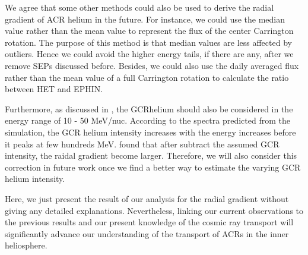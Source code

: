 We agree that some other methods could also be used to derive the radial gradient of \ac{ACR} helium in the future. For instance, we could use the median value rather than the mean value to represent the flux of the center Carrington rotation. The purpose of this method is that median values are less affected by outliers. Hence we could avoid the higher energy tails, if there are any, after we remove \acp{SEP} discussed before. Besides, we could also use the daily averaged flux rather than the mean value of a full Carrington rotation to calculate the ratio between \ac{HET} and \ac{EPHIN}. 


Furthermore, as discussed in \citet{Rankin2021ApJ}, the \ac{GCR}helium should also be considered in the energy range of 10 - 50 MeV/nuc. According to the spectra predicted from the simulation, the \ac{GCR} helium intensity increases with the energy increases before it peaks at few hundreds MeV. \citet{Rankin2021ApJ} found that after subtract the assumed \ac{GCR} intensity, the raidal gradient become larger. Therefore, we will also consider this correction in future work once we find a better way to estimate the varying \ac{GCR} helium intensity.

Here, we just present the result of our analysis for the radial gradient without giving any detailed explanations. Nevertheless, linking our current observations to the previous results and our present knowledge of the cosmic ray transport will significantly advance our understanding of the transport of \acp{ACR} in the inner heliosphere.




